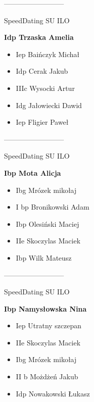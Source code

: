 \documentclass[a4paper,10pt]{article}
\begin{document}
\begin{multicols}{3}
\begin{minipage}[l]{\textwidth}
\end{minipage}



\begin{minipage}[l]{\textwidth}
--------------------------

  \footnotesize{SpeedDating SU ILO}

  \bfseries{Idp Trzaska Amelia}

  \begin{itemize}
    \item Iep Baińczyk Michał
    \item Idp Cerak Jakub
    \item IIIc Wysocki Artur
    \item Idg Jałowiecki Dawid
    \item Iep Fligier Paweł

    \end{itemize}



\end{minipage}



\begin{minipage}[l]{\textwidth}
--------------------------

  \footnotesize{SpeedDating SU ILO}

  \bfseries{Ibp Mota Alicja}

  \begin{itemize}
    \item Ibg Mrózek mikołaj
    \item I bp Bronikowski Adam
    \item Ibp Olesiński Maciej
    \item IIe Skoczylas Maciek
    \item Ibp Wilk Mateusz

    \end{itemize}



\end{minipage}



\begin{minipage}[l]{\textwidth}
--------------------------

  \footnotesize{SpeedDating SU ILO}

  \bfseries{Ibp Namysłowska Nina}

  \begin{itemize}
    \item Iep Utratny szczepan
    \item IIe Skoczylas Maciek
    \item Ibg Mrózek mikołaj
    \item II b Możdżeń Jakub
    \item Idp Nowakowski Łukasz


\end{itemize}
\end{minipage}
\end{multicols}
\end{document}
